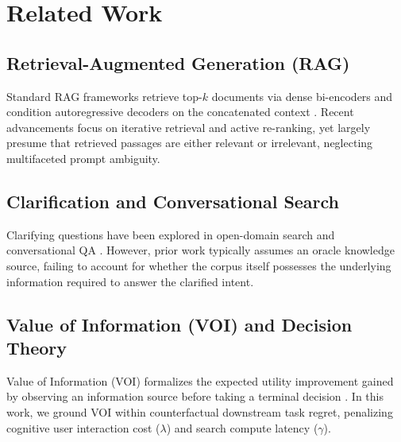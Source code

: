 \section{Related Work}
\label{sec:related_work}

\subsection{Retrieval-Augmented Generation (RAG)}
Standard RAG frameworks retrieve top-$k$ documents via dense bi-encoders and condition autoregressive decoders on the concatenated context \cite{lewis2020retrieval}. Recent advancements focus on iterative retrieval and active re-ranking, yet largely presume that retrieved passages are either relevant or irrelevant, neglecting multifaceted prompt ambiguity.

\subsection{Clarification and Conversational Search}
Clarifying questions have been explored in open-domain search and conversational QA \cite{min2020ambigqa}. However, prior work typically assumes an oracle knowledge source, failing to account for whether the corpus itself possesses the underlying information required to answer the clarified intent.

\subsection{Value of Information (VOI) and Decision Theory}
Value of Information (VOI) formalizes the expected utility improvement gained by observing an information source before taking a terminal decision \cite{howard1966information}. In this work, we ground VOI within counterfactual downstream task regret, penalizing cognitive user interaction cost ($\lambda$) and search compute latency ($\gamma$).
